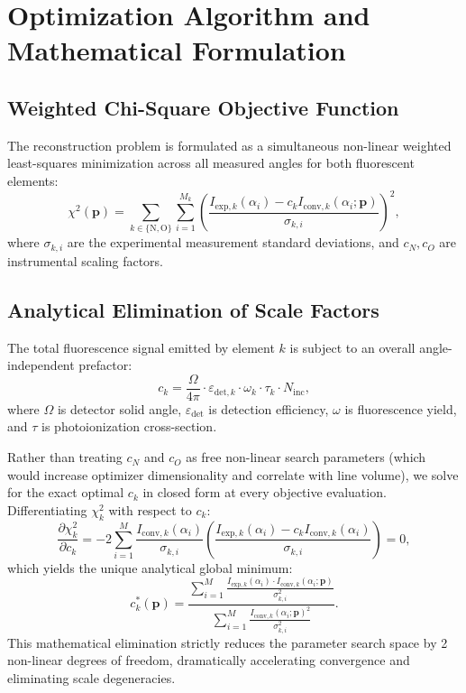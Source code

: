 \documentclass[11pt,a4paper]{article}
\begin{document}
\section{Optimization Algorithm and Mathematical Formulation}

\subsection{Weighted Chi-Square Objective Function}
The reconstruction problem is formulated as a simultaneous non-linear weighted least-squares minimization across all measured angles for both fluorescent elements:
\begin{equation}
    \chi^2(\mathbf{p}) = \sum_{k \in \{\mathrm{N}, \mathrm{O}\}} \sum_{i=1}^{M_k} \left( \frac{I_{\mathrm{exp}, k}(\alpha_i) - c_k I_{\mathrm{conv}, k}(\alpha_i; \mathbf{p})}{\sigma_{k, i}} \right)^2,
\end{equation}
where $\sigma_{k, i}$ are the experimental measurement standard deviations, and $c_N, c_O$ are instrumental scaling factors.

\subsection{Analytical Elimination of Scale Factors}
The total fluorescence signal emitted by element $k$ is subject to an overall angle-independent prefactor:
\begin{equation}
    c_k = \frac{\Omega}{4\pi} \cdot \varepsilon_{\mathrm{det}, k} \cdot \omega_k \cdot \tau_k \cdot N_{\mathrm{inc}},
\end{equation}
where $\Omega$ is detector solid angle, $\varepsilon_{\mathrm{det}}$ is detection efficiency, $\omega$ is fluorescence yield, and $\tau$ is photoionization cross-section.

Rather than treating $c_N$ and $c_O$ as free non-linear search parameters (which would increase optimizer dimensionality and correlate with line volume), we solve for the exact optimal $c_k$ in closed form at every objective evaluation. Differentiating $\chi^2_k$ with respect to $c_k$:
\begin{equation}
    \frac{\partial \chi^2_k}{\partial c_k} = -2 \sum_{i=1}^M \frac{I_{\mathrm{conv}, k}(\alpha_i)}{\sigma_{k, i}} \left( \frac{I_{\mathrm{exp}, k}(\alpha_i) - c_k I_{\mathrm{conv}, k}(\alpha_i)}{\sigma_{k, i}} \right) = 0,
\end{equation}
which yields the unique analytical global minimum:
\begin{equation}
    \boxed{c_k^*(\mathbf{p}) = \frac{\sum_{i=1}^M \frac{I_{\mathrm{exp}, k}(\alpha_i) \cdot I_{\mathrm{conv}, k}(\alpha_i; \mathbf{p})}{\sigma_{k, i}^2}}{\sum_{i=1}^M \frac{I_{\mathrm{conv}, k}(\alpha_i; \mathbf{p})^2}{\sigma_{k, i}^2}}}.
\end{equation}
This mathematical elimination strictly reduces the parameter search space by 2 non-linear degrees of freedom, dramatically accelerating convergence and eliminating scale degeneracies.
\end{document}
